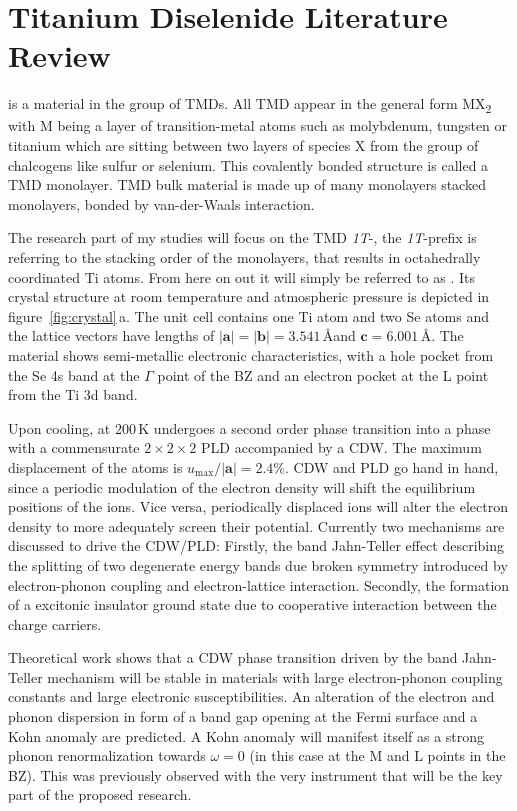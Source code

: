 \section{Titanium Diselenide Literature Review}
\ts\space is a material in the group of \acp{TMD}.
All \ac{TMD} appear in the general form MX\textsubscript{2} with M being a layer of transition-metal atoms such as molybdenum, tungsten or titanium which are sitting between two layers of species X from the group of chalcogens like sulfur or selenium.
This covalently bonded structure is called a \ac{TMD} monolayer.
\Ac{TMD} bulk material is made up of many monolayers stacked monolayers, bonded by van-der-Waals interaction.

The research part of my studies will focus on the \ac{TMD} \textit{1T}-\ts, the \textit{1T}-prefix is referring to the stacking order of the monolayers, that results in octahedrally coordinated Ti atoms.
From here on out it will simply be referred to as \ts.
Its crystal structure at room temperature and atmospheric pressure is depicted in figure~\ref{fig:crystal}\,a.
The unit cell contains one Ti atom and two Se atoms and the lattice vectors have lengths of $|\mathbf{a}|=|\mathbf{b}|=3.541$\,\AA\space and $\mathbf{c}=6.001$\,\AA\cite{patel1983}.
The material shows semi-metallic electronic characteristics\cite{bachrach1976}, with a hole pocket from the Se 4s band at the $\Gamma$ point of the \ac{BZ} and an electron pocket at the L point from the Ti 3d band\cite{zunger1978}.

Upon cooling, at 200\,K\cite{disalvo1976} \ts\space undergoes a second order phase transition into a phase with a commensurate $2\times2\times2$ \ac{PLD} accompanied by a \ac{CDW}\cite{rossnagel2011}.
The maximum displacement of the atoms is $u_\mathrm{max}/|\mathbf{a}|=2.4\%$\cite{disalvo1976}.
\ac{CDW} and \ac{PLD} go hand in hand, since a periodic modulation of the electron density will shift the equilibrium positions of the ions.
Vice versa, periodically displaced ions will alter the electron density to more adequately screen their potential.
Currently two mechanisms are discussed to drive the \ac{CDW}/\ac{PLD}: 
Firstly, the band Jahn-Teller effect describing the splitting of two degenerate energy bands due broken symmetry introduced by electron-phonon coupling and electron-lattice interaction\cite{rossnagel2002}.
Secondly, the formation of a excitonic insulator ground state due to cooperative interaction between the charge carriers\cite{cercellier2007,kogar2017}.

Theoretical work shows that a \ac{CDW} phase transition driven by the band Jahn-Teller mechanism will be stable in materials with large electron-phonon coupling constants and large electronic susceptibilities\cite{friend1979}.
An alteration of the electron and phonon dispersion in form of a band gap opening at the Fermi surface and a Kohn anomaly are predicted.
A Kohn anomaly will manifest itself as a strong phonon renormalization towards $\omega=0$\cite{kohn1959} (in this case at the M and L points in the \ac{BZ}).
This was previously observed with the very instrument that will be the key part of the proposed research\cite{otto2021}.

